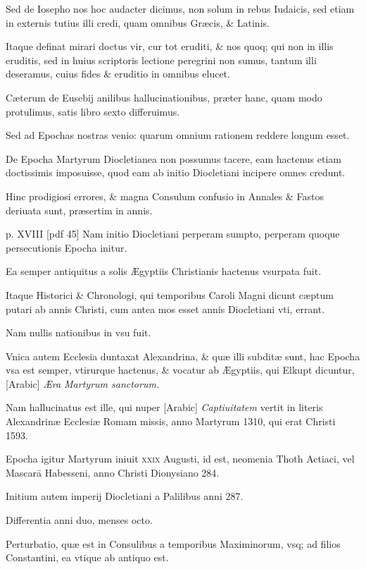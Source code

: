 \begin{parnumbers}
Sed de Iosepho
nos hoc audacter dicimus, non solum in rebus Iudaicis, sed etiam
in externis tutius illi credi, quam omnibus Græcis, \& Latinis.

Itaque
definat mirari doctus vir, cur tot eruditi, \& nos quoq; qui non in illis
eruditis, sed in huius scriptoris lectione peregrini non sumus, tantum
illi deseramus, cuius fides \& eruditio in omnibus elucet.

Cæterum de Eusebij anilibus hallucinationibus, præter hanc, quam
modo protulimus, satis libro sexto differuimus.

Sed ad Epochas
nostras venio: quarum omnium rationem reddere longum esset.

De Epocha Martyrum Diocletianea non possumus tacere, eam hactenus
etiam doctissimis imposuisse, quod eam ab initio Diocletiani
incipere omnes credunt.

Hinc prodigiosi errores, \& magna Consulum
confusio in Annales \& Fastos deriuata sunt, præsertim in annis.

\clearpage
p. XVIII [pdf 45]
Nam initio Diocletiani perperam sumpto, perperam quoque
persecutionis Epocha initur.

Ea semper antiquitus a solis Ægyptiis
Christianis hactenus vsurpata fuit.

Itaque Historici \& Chronologi,
qui temporibus Caroli Magni dicunt cæptum putari ab annis
Christi, cum antea mos esset annis Diocletiani vti, errant.

Nam
nullis nationibus in vsu fuit.

Vnica autem Ecclesia duntaxat Alexandrina,
\& quæ illi subditæ sunt, hac Epocha vsa est semper, vtirurque
hactenus, \& vocatur ab Ægyptiis, qui Elkupt dicuntur,
\textarabic{[Arabic]} \textit{Æra Martyrum sanctorum.}

Nam
hallucinatus est ille, qui nuper \textarabic{[Arabic]}
\textit{Captiuitatem} vertit in literis
Alexandrinæ Ecclesiæ Romam missis, anno Martyrum 1310, qui
erat Christi 1593.

Epocha igitur Martyrum iniuit \textsc{xxix} Augusti,
id est, neomenia Thoth Actiaci, vel Mascarā Habesseni, anno Christi
Dionysiano 284.

Initium autem imperij Diocletiani a Palilibus
anni 287.

Differentia anni duo, menses octo.

Perturbatio, quæ est in
Consulibus a temporibus Maximinorum, vsq; ad filios Constantini,
ea vtique ab antiquo est.


\end{parnumbers}

